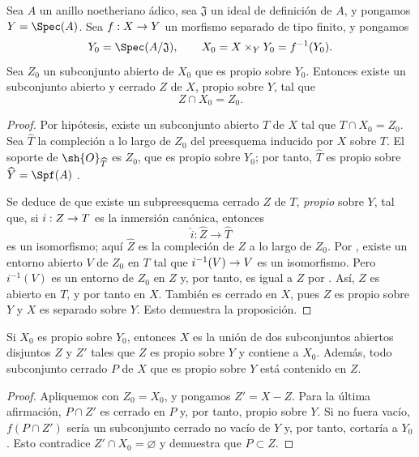 \documentclass[oneside]{amsart}
\makeatletter
\newcommand{\ega@arrow}[2]{\mathchoice{#1}{#2}{#2}{#2}}
\renewcommand{\to}{\ega@arrow{\longrightarrow}{\rightarrow}}
\let\EGAOriginalLabel\label
\renewcommand{\label}[1]{\phantomsection\EGAOriginalLabel{#1}}
\makeatother
\begin{document}
\begin{proposition}[5.5.1]
\label{III.5.5.1}
Sea $A$ un anillo noetheriano ádico, sea $\mathfrak{J}$ un ideal
de definición de $A$, y pongamos $Y=\Spec(A)$. Sea $f:X\to Y$ un
morfismo separado de tipo finito, y pongamos
\[
  Y_0=\Spec(A/\mathfrak{J}),\qquad
  X_0=X\times_Y Y_0=f^{-1}(Y_0).
\]
Sea $Z_0$ un subconjunto abierto de $X_0$ que es propio sobre $Y_0$.
Entonces existe un subconjunto abierto y cerrado $Z$ de $X$, propio sobre
$Y$, tal que
\[
  Z\cap X_0=Z_0.
\]
\end{proposition}

\begin{proof}
Por hipótesis, existe un subconjunto abierto $T$ de $X$ tal que
$T\cap X_0=Z_0$. Sea $\widehat{T}$ la compleción a lo largo de $Z_0$
del preesquema inducido por $X$ sobre $T$. El soporte de
$\sh{O}_{\widehat{T}}$ es $Z_0$, que es propio sobre $Y_0$;
por tanto, $\widehat{T}$ es propio sobre
$\widehat{Y}=\Spf(A)$ .

Se deduce de  que existe un subpreesquema cerrado
$Z$ de $T$, \emph{propio} sobre $Y$, tal que, si
$i:Z\to T$ es la inmersión canónica, entonces
\[
  \widehat{i}:\widehat{Z}\longrightarrow\widehat{T}
\]
es un isomorfismo; aquí $\widehat{Z}$ es la compleción de $Z$
a lo largo de $Z_0$. Por , existe un entorno abierto
$V$ de $Z_0$ en $T$ tal que
$i^{-1}(V)\to V$ es un isomorfismo. Pero $i^{-1}(V)$ es un
entorno de $Z_0$ en $Z$ y, por tanto, es igual a $Z$ por
. Así, $Z$ es abierto en $T$, y por tanto en $X$.
También es cerrado en $X$, pues $Z$ es propio sobre $Y$ y $X$ es
separado sobre $Y$. Esto demuestra la proposición.
\end{proof}

\begin{corollary}[5.5.2]
\label{III.5.5.2}
Si $X_0$ es propio sobre $Y_0$, entonces $X$ es la unión de dos
subconjuntos abiertos disjuntos $Z$ y $Z'$ tales que $Z$ es propio sobre
$Y$ y contiene a $X_0$. Además, todo subconjunto cerrado $P$ de $X$
que es propio sobre $Y$ está contenido en $Z$.
\end{corollary}

\begin{proof}
Apliquemos  con $Z_0=X_0$, y pongamos $Z'=X-Z$. Para la
última afirmación, $P\cap Z'$ es cerrado en $P$ y, por tanto, propio
sobre $Y$. Si no fuera vacío, $f(P\cap Z')$ sería un subconjunto cerrado
no vacío de $Y$ y, por tanto, cortaría a $Y_0$
. Esto contradice
$Z'\cap X_0=\varnothing$ y demuestra que $P\subset Z$.
\end{proof}
\end{document}
